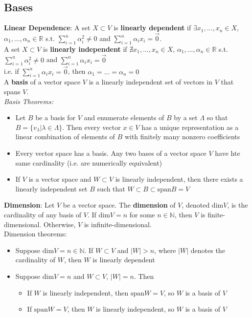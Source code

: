 \documentclass{article}
\newcommand{\N}{\mathbb{N}}
\newcommand{\R}{\mathbb{R}}
\begin{document}
\subsection{Bases}
\textbf{Linear Dependence}: A set $X\subset V$ is \textbf{linearly dependent} if $\exists x_1,...,x_n\in X$, $\alpha_1,...,\alpha_n\in\R$ s.t. $\sum_{i=1}^n \alpha_i^2\neq 0$ and $\sum_{i=1}^n \alpha_i x_i = \vec{0}$.
\smallskip \\
A set $X\subset V$ is \textbf{linearly independent} if $\nexists x_1,...,x_n\in X$, $\alpha_1,...,\alpha_n\in\R$ s.t. $\sum_{i=1}^n \alpha_i^2\neq 0$ and $\sum_{i=1}^n \alpha_i x_i = \vec{0}$
\smallskip \\
i.e. if  $\sum_{i=1}^n \alpha_i x_i = \vec{0}$, then $\alpha_1=...=\alpha_n=0$
\medskip \\
A \textbf{basis} of a vector space $V$ is a linearly independent set of vectors in $V$ that spans $V$.
\medskip \\
\textit{Basis Theorems:}
\begin{itemize}
	\item Let $B$ be a basis for $V$ and enumerate elements of $B$ by a set $\Lambda$ so that $B=\{v_\lambda|\lambda\in\Lambda\}$. Then every vector $x\in V$ has a unique representation as a linear combination of elements of $B$ with finitely many nonzero coefficients
	
	\item Every vector space has a basis. Any two bases of a vector space $V$ have hte same cardinality (i.e. are numerically equivalent)
	
	\item If $V$ is a vector space and $W\subset V$ is linearly independent, then there exists a linearly independent set $B$ such that $W\subset B\subset \text{span}B=V$
\end{itemize}
\medskip
\textbf{Dimension}: Let $V$ be a vector space. The \textbf{dimension} of $V$, denoted $\text{dim}V$, is the cardinality of any basis of $V$. If $\text{dim}V=n$ for some $n\in\N$, then $V$ is finite-dimensional. Otherwise, $V$ is infinite-dimensional.
\smallskip \\
Dimension theorems:
\begin{itemize}
	\item Suppose $\text{dim}V=n\in\N$. If $W\subset V$ and $|W|>n$, where $|W|$ denotes the cardinality of $W$, then $W$ is linearly dependent
	
	\item Suppose $\text{dim}V=n$ and $W\subset V$, $|W|=n$. Then 
		\begin{itemize}
			\item If $W$ is linearly independent, then $\text{span}W=V$, so $W$ is a basis of $V$ 
			\item If $\text{span}W=V$, then $W$ is linearly independent, so $W$ is a basis of $V$
		\end{itemize}
\end{itemize}
\end{document}
